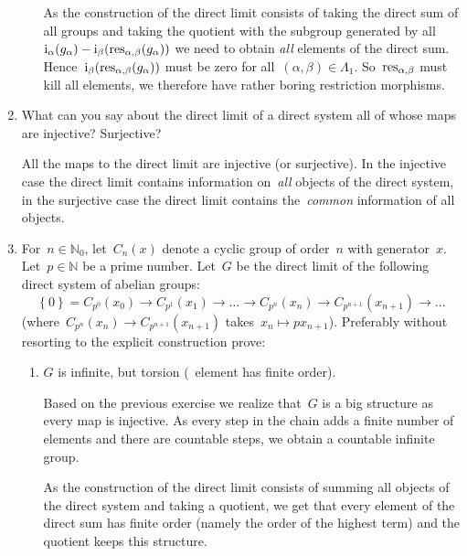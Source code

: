 \documentclass[a4paper,11pt,oneside,openany,article]{memoir}
\begin{document}
\begin{enumerate}
\begin{enumerate}
        \begin{solution}
          As the construction of the direct limit consists of taking the direct sum of all groups and taking the quotient with the subgroup generated by all~$\mathrm{i}_\alpha(g_\alpha)-\mathrm{i}_\beta(\mathrm{res}_{\alpha,\beta}(g_\alpha))$ we need to obtain \emph{all} elements of the direct sum. Hence~$\mathrm{i}_\beta(\mathrm{res}_{\alpha,\beta}(g_\alpha))$ must be zero for all~$(\alpha,\beta)\in\Lambda_1$. So~$\mathrm{res}_{\alpha,\beta}$ must kill all elements, we therefore have rather boring restriction morphisms.
        \end{solution}
    \end{enumerate}

  \item What can you say about the direct limit of a direct system all of whose maps are injective? Surjective?

    \begin{solution}
      All the maps to the direct limit are injective (or surjective). In the injective case the direct limit contains information on~\emph{all} objects of the direct system, in the surjective case the direct limit contains the~\emph{common} information of all objects.
    \end{solution}

  \item For~$n\in\mathbb{N}_0$, let~$C_n(x)$ denote a cyclic group of order~$n$ with generator~$x$. Let~$p\in\mathbb{N}$ be a prime number. Let~$G$ be the direct limit of the following direct system of abelian groups:
    \begin{equation}
      \left\{ 0 \right\}=C_{p^0}(x_0)\rightarrow C_{p^1}(x_1)\rightarrow\ldots\rightarrow C_{p^n}(x_n)\rightarrow C_{p^{n+1}}(x_{n+1})\rightarrow\ldots
    \end{equation}
    (where~$C_{p^n}(x_n)\rightarrow C_{p^{n+1}}(x_{n+1})$ takes~$x_n\mapsto px_{n+1}$). Preferably without resorting to the explicit construction prove:
    \begin{enumerate}
      \item $G$ is infinite, but torsion (\ie~element has finite order).

        \begin{solution}
          Based on the previous exercise we realize that~$G$ is a big structure as every map is injective. As every step in the chain adds a finite number of elements and there are countable steps, we obtain a countable infinite group.

          As the construction of the direct limit consists of summing all objects of the direct system and taking a quotient, we get that every element of the direct sum has finite order (namely the order of the highest term) and the quotient keeps this structure.
        \end{solution}


\end{enumerate}
\end{enumerate}
\end{document}
